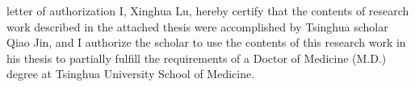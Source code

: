
\begin{loa}

  letter of authorization
  I, Xinghua Lu, hereby certify that the contents of research work described in the attached thesis were accomplished by Tsinghua scholar Qiao Jin, and I authorize the scholar to use the contents of this research work in his thesis to partially fulfill the requirements of a Doctor of Medicine (M.D.) degree at Tsinghua University School of Medicine.

\end{loa}
